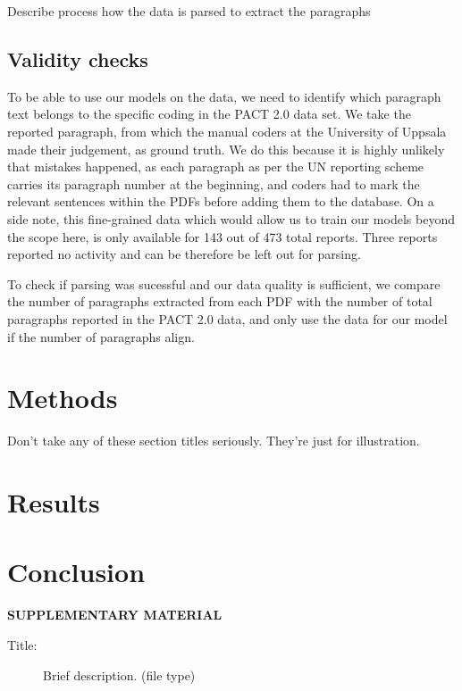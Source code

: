 \documentclass[
  12pt]{article}
\begin{document}
Describe process how the data is parsed to extract the paragraphs

\subsection{Validity checks}\label{validity-checks}

To be able to use our models on the data, we need to identify which
paragraph text belongs to the specific coding in the PACT 2.0 data set.
We take the reported paragraph, from which the manual coders at the
University of Uppsala made their judgement, as ground truth. We do this
because it is highly unlikely that mistakes happened, as each paragraph
as per the UN reporting scheme carries its paragraph number at the
beginning, and coders had to mark the relevant sentences within the PDFs
before adding them to the database. On a side note, this fine-grained
data which would allow us to train our models beyond the scope here, is
only available for 143 out of 473 total reports. Three reports reported
no activity and can be therefore be left out for parsing.

To check if parsing was sucessful and our data quality is sufficient, we
compare the number of paragraphs extracted from each PDF with the number
of total paragraphs reported in the PACT 2.0 data, and only use the data
for our model if the number of paragraphs align.

\section{Methods}\label{sec-meth}

Don't take any of these section titles seriously. They're just for
illustration.

\section{Results}\label{sec-results}

\section{Conclusion}\label{sec-conc}

\label{supplementary-material}
\bigskip

\begin{center}

{\large\bf SUPPLEMENTARY MATERIAL}

\end{center}

\begin{description}
\item[Title:]
Brief description. (file type)
\end{description}


  
\end{document}
